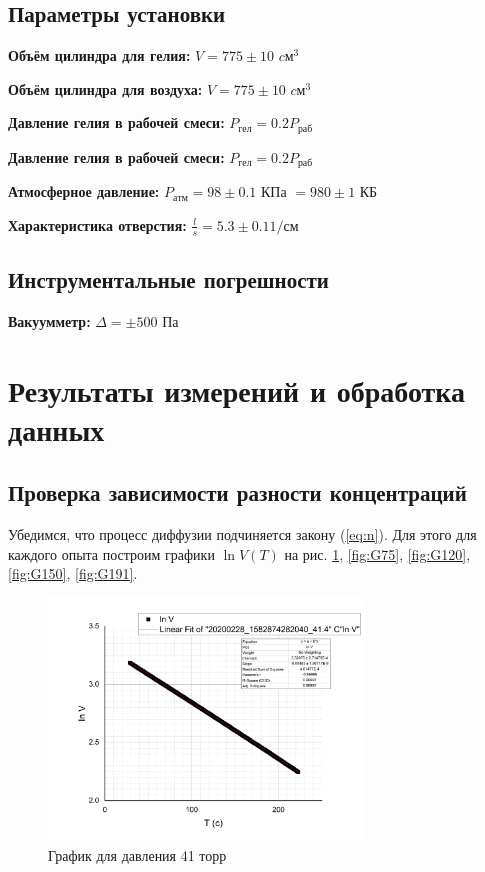 \documentclass[a4paper]{article}
\begin{document}
\subsection{Параметры установки}
{\bf Объём цилиндра для гелия: } $V = 775 \pm 10 $ $cм^3$

{\bf Объём цилиндра для воздуха: } $V = 775 \pm 10 $ $cм^3$

{\bf Давление гелия в рабочей смеси: } $P_{гел} = 0.2 P_{раб} $

{\bf Давление гелия в рабочей смеси: } $P_{гел} = 0.2 P_{раб} $

{\bf Атмосферное давление: } $P_{атм} = 98 \pm 0.1$ КПа $= 980 \pm 1$ КБ

{\bf Характеристика отверстия: } $\frac{l}{s} = 5.3 \pm 0.1 1/см$

\subsection{Инструментальные погрешности}
{\bf Вакуумметр: } $\Delta = \pm 500 $ Па

\section{Результаты измерений и обработка данных}
\subsection{Проверка зависимости разности концентраций}
Убедимся, что процесс диффузии подчиняется закону (\ref{eq:n}).
Для этого для каждого опыта построим графики $\ln V (T)$ на рис. \ref{fig:G41}, \ref{fig:G75}, \ref{fig:G120}, \ref{fig:G150}, \ref{fig:G191}.

\begin{figure}[p]
	\centering
		\includegraphics[width=0.75\textwidth]{G41.jpg}
	\caption{График для давления 41 торр}
	\label{fig:G41}
\end{figure}
\end{document}
